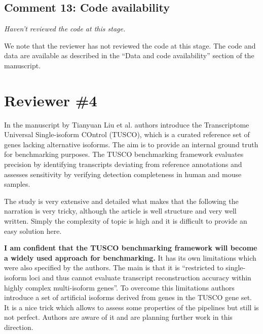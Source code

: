 \documentclass[11pt]{article}
\begin{document}
\subsection{Comment 13: Code availability}

\begin{reviewercomment}
\textit{Haven't reviewed the code at this stage.}
\end{reviewercomment}

\begin{responseboxnew}
We note that the reviewer has not reviewed the code at this stage. The code and data are available as described in the ``Data and code availability'' section of the manuscript.
\end{responseboxnew}

\newpage

\section{Reviewer \#4}

\begin{positiveremarks}
In the manuscript by Tianyuan Liu et al. authors introduce the Transcriptome Universal Single-isoform COntrol (TUSCO), which is a curated reference set of genes lacking alternative isoforms. The aim is to provide an internal ground truth for benchmarking purposes. The TUSCO benchmarking framework evaluates precision by identifying transcripts deviating from reference annotations and assesses sensitivity by verifying detection completeness in human and mouse samples.

\vspace{0.2cm}
The study is very extensive and detailed what makes that the following the narration is very tricky, although the article is well structure and very well written. Simply the complexity of topic is high and it is difficult to provide an easy solution here.

\vspace{0.2cm}
\textbf{I am confident that the TUSCO benchmarking framework will become a widely used approach for benchmarking.} It has its own limitations which were also specified by the authors. The main is that it is ``restricted to single-isoform loci and thus cannot evaluate transcript reconstruction accuracy within highly complex multi-isoform genes''. To overcome this limitations authors introduce a set of artificial isoforms derived from genes in the TUSCO gene set. It is a nice trick which allows to assess some properties of the pipelines but still is not perfect. Authors are aware of it and are planning further work in this direction.
\end{positiveremarks}
\end{document}
